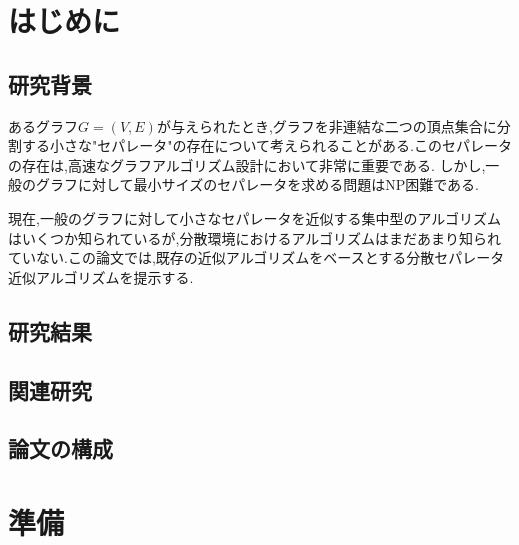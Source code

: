 \documentclass{thesis}
\theoremstyle{definition}
\begin{document}
\baselineskip=22pt
\pagestyle{empty}

\maketitle

\pagestyle{myheadings}	%
\tableofcontents

\newpage


\chapter{はじめに}

\section{研究背景}

あるグラフ$G=(V,E)$が与えられたとき,グラフを非連結な二つの頂点集合に分割する小さな"セパレータ"の存在について考えられることがある.このセパレータの存在は,高速なグラフアルゴリズム設計において非常に重要である.
しかし,一般のグラフに対して最小サイズのセパレータを求める問題はNP困難である.\par
現在,一般のグラフに対して小さなセパレータを近似する集中型のアルゴリズムはいくつか知られているが,分散環境におけるアルゴリズムはまだあまり知られていない.この論文では,既存の近似アルゴリズムをベースとする分散セパレータ近似アルゴリズムを提示する.

\section{研究結果}

\section{関連研究}

\section{論文の構成}

\chapter{準備}
\end{document}
